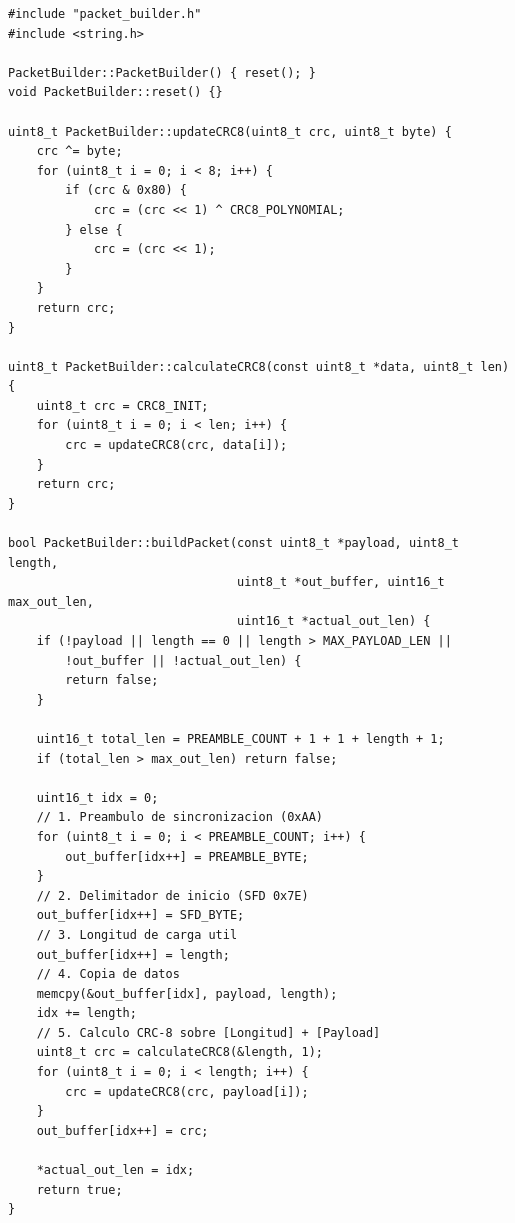 \begin{lstlisting}[style=customcpp, caption={Constructor de paquetes y cálculo de CRC-8 (\texttt{firmware\_tx/packet\_builder.cpp})}]
#include "packet_builder.h"
#include <string.h>

PacketBuilder::PacketBuilder() { reset(); }
void PacketBuilder::reset() {}

uint8_t PacketBuilder::updateCRC8(uint8_t crc, uint8_t byte) {
    crc ^= byte;
    for (uint8_t i = 0; i < 8; i++) {
        if (crc & 0x80) {
            crc = (crc << 1) ^ CRC8_POLYNOMIAL;
        } else {
            crc = (crc << 1);
        }
    }
    return crc;
}

uint8_t PacketBuilder::calculateCRC8(const uint8_t *data, uint8_t len) {
    uint8_t crc = CRC8_INIT;
    for (uint8_t i = 0; i < len; i++) {
        crc = updateCRC8(crc, data[i]);
    }
    return crc;
}

bool PacketBuilder::buildPacket(const uint8_t *payload, uint8_t length,
                                uint8_t *out_buffer, uint16_t max_out_len,
                                uint16_t *actual_out_len) {
    if (!payload || length == 0 || length > MAX_PAYLOAD_LEN ||
        !out_buffer || !actual_out_len) {
        return false;
    }

    uint16_t total_len = PREAMBLE_COUNT + 1 + 1 + length + 1;
    if (total_len > max_out_len) return false;

    uint16_t idx = 0;
    // 1. Preambulo de sincronizacion (0xAA)
    for (uint8_t i = 0; i < PREAMBLE_COUNT; i++) {
        out_buffer[idx++] = PREAMBLE_BYTE;
    }
    // 2. Delimitador de inicio (SFD 0x7E)
    out_buffer[idx++] = SFD_BYTE;
    // 3. Longitud de carga util
    out_buffer[idx++] = length;
    // 4. Copia de datos
    memcpy(&out_buffer[idx], payload, length);
    idx += length;
    // 5. Calculo CRC-8 sobre [Longitud] + [Payload]
    uint8_t crc = calculateCRC8(&length, 1);
    for (uint8_t i = 0; i < length; i++) {
        crc = updateCRC8(crc, payload[i]);
    }
    out_buffer[idx++] = crc;

    *actual_out_len = idx;
    return true;
}
\end{lstlisting}

